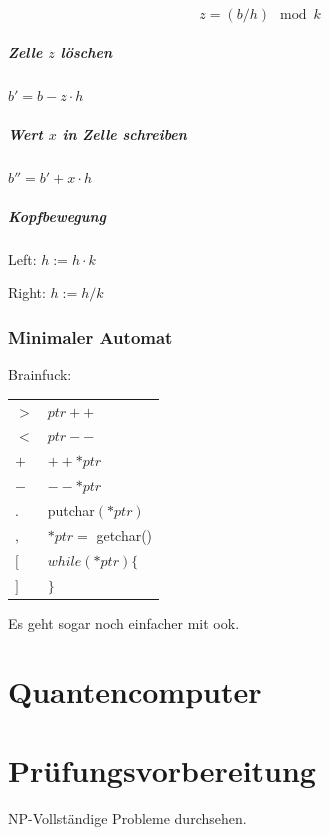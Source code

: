 \[
z = (b/h) \mod k
\]

\subparagraph{Zelle $z$ löschen}

$b' = b - z \cdot h$

\subparagraph{Wert $x$ in Zelle schreiben}

$b'' = b' + x \cdot h$

\subparagraph{Kopfbewegung}

Left: $h := h \cdot k$

Right: $h := h/k$


\subsubsection{Minimaler Automat}

Brainfuck:
\begin{tabu}{l l}
$>$ & $ptr++$ \\
$<$ & $ptr--$ \\
$+$ & $++*ptr$ \\
$-$ & $--*ptr$ \\
$.$ & putchar$(*ptr)$ \\
$,$ & $*ptr = $ getchar() \\
$[$ & $while(*ptr) \{$ \\
$]$ & $\}$
\end{tabu}

Es geht sogar noch einfacher mit ook.

\section{Quantencomputer}



\section{Prüfungsvorbereitung}

NP-Vollständige Probleme durchsehen.

